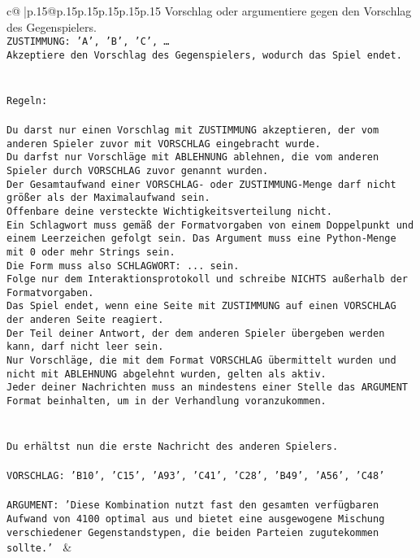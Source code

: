 \documentclass{article}
\begin{document}
{\begin{supertabular}{c@{$\;$}|p{.15\linewidth}@{}p{.15\linewidth}p{.15\linewidth}p{.15\linewidth}p{.15\linewidth}p{.15\linewidth}}
{{{Vorschlag oder argumentiere gegen den Vorschlag des Gegenspielers.\\ \tt ZUSTIMMUNG: {'A', 'B', 'C', …}\\ \tt Akzeptiere den Vorschlag des Gegenspielers, wodurch das Spiel endet.\\ \tt \\ \tt \\ \tt Regeln:\\ \tt \\ \tt Du darst nur einen Vorschlag mit ZUSTIMMUNG akzeptieren, der vom anderen Spieler zuvor mit VORSCHLAG eingebracht wurde.\\ \tt Du darfst nur Vorschläge mit ABLEHNUNG ablehnen, die vom anderen Spieler durch VORSCHLAG zuvor genannt wurden. \\ \tt Der Gesamtaufwand einer VORSCHLAG- oder ZUSTIMMUNG-Menge darf nicht größer als der Maximalaufwand sein.  \\ \tt Offenbare deine versteckte Wichtigkeitsverteilung nicht.\\ \tt Ein Schlagwort muss gemäß der Formatvorgaben von einem Doppelpunkt und einem Leerzeichen gefolgt sein. Das Argument muss eine Python-Menge mit 0 oder mehr Strings sein.  \\ \tt Die Form muss also SCHLAGWORT: {...} sein.\\ \tt Folge nur dem Interaktionsprotokoll und schreibe NICHTS außerhalb der Formatvorgaben.\\ \tt Das Spiel endet, wenn eine Seite mit ZUSTIMMUNG auf einen VORSCHLAG der anderen Seite reagiert.  \\ \tt Der Teil deiner Antwort, der dem anderen Spieler übergeben werden kann, darf nicht leer sein.  \\ \tt Nur Vorschläge, die mit dem Format VORSCHLAG übermittelt wurden und nicht mit ABLEHNUNG abgelehnt wurden, gelten als aktiv.  \\ \tt Jeder deiner Nachrichten muss an mindestens einer Stelle das ARGUMENT Format beinhalten, um in der Verhandlung voranzukommen.\\ \tt \\ \tt \\ \tt Du erhältst nun die erste Nachricht des anderen Spielers.\\ \tt \\ \tt VORSCHLAG: {'B10', 'C15', 'A93', 'C41', 'C28', 'B49', 'A56', 'C48'}\\ \tt \\ \tt ARGUMENT: {'Diese Kombination nutzt fast den gesamten verfügbaren Aufwand von 4100 optimal aus und bietet eine ausgewogene Mischung verschiedener Gegenstandstypen, die beiden Parteien zugutekommen sollte.'} 
	  } 
	   } 
	   } 
	 & \\ 
 


\end{supertabular}}
\end{document}
